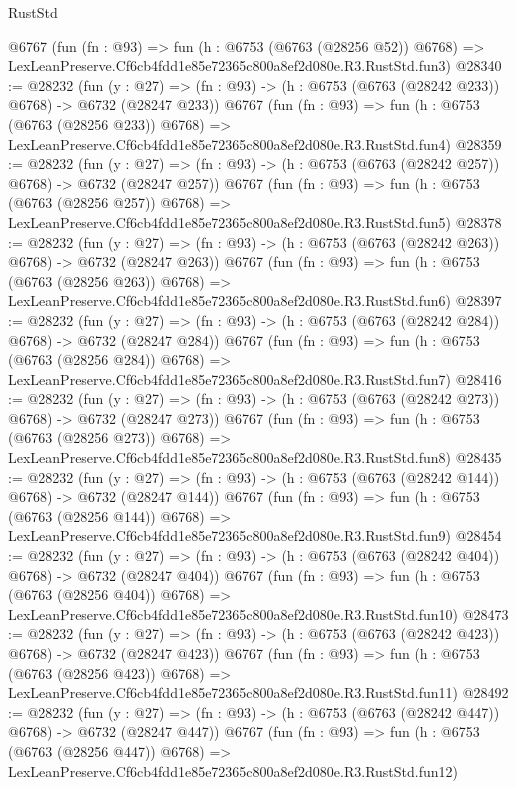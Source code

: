 \begin{lexlean}{RustStd}
\begin{coremodule}
    @6767
    (fun (fn : @93) =>
    fun (h : @6753 (@6763 (@28256 @52)) @6768) =>
    LexLeanPreserve.Cf6cb4fdd1e85e72365c800a8ef2d080e.R3.RustStd.fun3)
@28340 := @28232
    (fun (y : @27) => (fn : @93) -> (h : @6753 (@6763 (@28242 @233)) @6768) -> @6732 (@28247 @233))
    @6767
    (fun (fn : @93) =>
    fun (h : @6753 (@6763 (@28256 @233)) @6768) =>
    LexLeanPreserve.Cf6cb4fdd1e85e72365c800a8ef2d080e.R3.RustStd.fun4)
@28359 := @28232
    (fun (y : @27) => (fn : @93) -> (h : @6753 (@6763 (@28242 @257)) @6768) -> @6732 (@28247 @257))
    @6767
    (fun (fn : @93) =>
    fun (h : @6753 (@6763 (@28256 @257)) @6768) =>
    LexLeanPreserve.Cf6cb4fdd1e85e72365c800a8ef2d080e.R3.RustStd.fun5)
@28378 := @28232
    (fun (y : @27) => (fn : @93) -> (h : @6753 (@6763 (@28242 @263)) @6768) -> @6732 (@28247 @263))
    @6767
    (fun (fn : @93) =>
    fun (h : @6753 (@6763 (@28256 @263)) @6768) =>
    LexLeanPreserve.Cf6cb4fdd1e85e72365c800a8ef2d080e.R3.RustStd.fun6)
@28397 := @28232
    (fun (y : @27) => (fn : @93) -> (h : @6753 (@6763 (@28242 @284)) @6768) -> @6732 (@28247 @284))
    @6767
    (fun (fn : @93) =>
    fun (h : @6753 (@6763 (@28256 @284)) @6768) =>
    LexLeanPreserve.Cf6cb4fdd1e85e72365c800a8ef2d080e.R3.RustStd.fun7)
@28416 := @28232
    (fun (y : @27) => (fn : @93) -> (h : @6753 (@6763 (@28242 @273)) @6768) -> @6732 (@28247 @273))
    @6767
    (fun (fn : @93) =>
    fun (h : @6753 (@6763 (@28256 @273)) @6768) =>
    LexLeanPreserve.Cf6cb4fdd1e85e72365c800a8ef2d080e.R3.RustStd.fun8)
@28435 := @28232
    (fun (y : @27) => (fn : @93) -> (h : @6753 (@6763 (@28242 @144)) @6768) -> @6732 (@28247 @144))
    @6767
    (fun (fn : @93) =>
    fun (h : @6753 (@6763 (@28256 @144)) @6768) =>
    LexLeanPreserve.Cf6cb4fdd1e85e72365c800a8ef2d080e.R3.RustStd.fun9)
@28454 := @28232
    (fun (y : @27) => (fn : @93) -> (h : @6753 (@6763 (@28242 @404)) @6768) -> @6732 (@28247 @404))
    @6767
    (fun (fn : @93) =>
    fun (h : @6753 (@6763 (@28256 @404)) @6768) =>
    LexLeanPreserve.Cf6cb4fdd1e85e72365c800a8ef2d080e.R3.RustStd.fun10)
@28473 := @28232
    (fun (y : @27) => (fn : @93) -> (h : @6753 (@6763 (@28242 @423)) @6768) -> @6732 (@28247 @423))
    @6767
    (fun (fn : @93) =>
    fun (h : @6753 (@6763 (@28256 @423)) @6768) =>
    LexLeanPreserve.Cf6cb4fdd1e85e72365c800a8ef2d080e.R3.RustStd.fun11)
@28492 := @28232
    (fun (y : @27) => (fn : @93) -> (h : @6753 (@6763 (@28242 @447)) @6768) -> @6732 (@28247 @447))
    @6767
    (fun (fn : @93) =>
    fun (h : @6753 (@6763 (@28256 @447)) @6768) =>
    LexLeanPreserve.Cf6cb4fdd1e85e72365c800a8ef2d080e.R3.RustStd.fun12)

\end{coremodule}
\end{lexlean}
